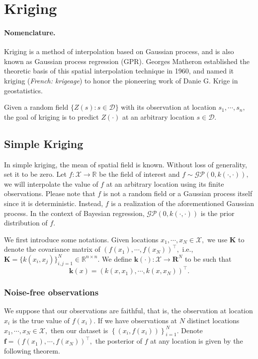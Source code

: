 \documentclass{article}
\begin{document}
\newpage

\section{Kriging}
\paragraph{Nomenclature.} Kriging is a method of interpolation based on Gaussian process, and is also known as Gaussian process regression (GPR). Georges Matheron established the theoretic basis of this spatial interpolation technique in 1960, and named it kriging (\textit{French: krigeage}) to honor the pioneering work of Danie G. Krige in geostatistics.

Given a random field $\lbrace Z(s): s\in\mathcal{D}\rbrace$ with its observation at location $s_1,\cdots,s_n,$ the goal of kriging is to predict $Z(\cdot)$ at an arbitrary location $s\in\mathcal{D}.$

\subsection{Simple Kriging}
In simple kriging, the mean of spatial field is known. Without loss of generality, set it to be zero. Let $f:\mathcal{X}\to{\mathbb{R}}$ be the field of interest and $f\sim\mathcal{GP}\left(0,k(\cdot,\cdot)\right),$ we will interpolate the value of $f$ at an arbitrary location using its finite observations. Please note that $f$ is not a random field or a Gaussian process itself since it is deterministic. Instead, $f$ is a realization of the aforementioned Gaussian process. In the context of Bayesian regression, $\mathcal{GP}(0,k(\cdot,\cdot))$ is the prior distribution of $f$.

We first introduce some notations. Given locations $x_1,\cdots,x_N\in\mathcal{X},$ we use $\mathbf{K}$ to denote the covariance matrix of $\left(f(x_1),\cdots,f(x_N)\right)^\top,$ i.e., $\mathbf{K} = \lbrace k(x_i,x_j)\rbrace_{i,j=1}^N\in\mathbb{R}^{n\times n}$. We define $\mathbf{k}(\cdot): \mathcal{X}\to\mathbf{R}^N$ to be such that
\begin{equation*}
	\mathbf{k}(x) = \left(k(x,x_1),\cdots,k(x,x_N)\right)^\top.\tag{4.1}
\end{equation*}

\subsubsection{Noise-free observations}
We suppose that our observations are faithful, that is, the observation at location $x_i$ is the true value of $f(x_i)$. If we have observations at $N$ distinct locations $x_1,\cdots,x_N\in\mathcal{X},$ then our dataset is $\left\lbrace\left(x_i,f(x_i)\right)\right\rbrace_{i=1}^N.$ Denote $\mathbf{f} = \left(f(x_1),\cdots,f(x_N)\right)^\top,$ the posterior of $f$ at any location is given by the following theorem.
\end{document}
